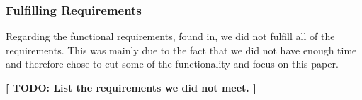 \subsubsection{Fulfilling Requirements}
Regarding the functional requirements, found in, we did not fulfill all of the requirements. This was mainly due to the fact that we did not have enough time and therefore chose to cut some of the functionality and focus on this paper.

\textbf{[ TODO: List the requirements we did not meet. ]}